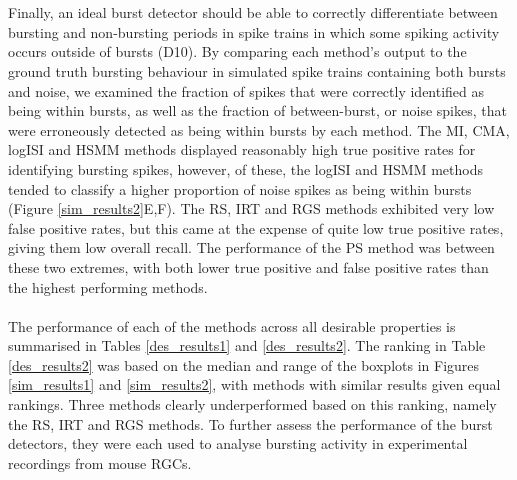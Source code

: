 \documentclass[12pt, titlepage]{article}
\begin{document}
	\\ \\ Finally, an ideal burst detector should be able to correctly differentiate between bursting and non-bursting periods in spike trains in which some spiking activity occurs outside of bursts (D10). By comparing each method's output to the ground truth bursting behaviour in simulated spike trains containing both bursts and noise, we examined the fraction of spikes that were correctly identified as being within bursts, as well as the fraction of between-burst, or noise spikes, that were erroneously detected as being within bursts by each method.
	The MI, CMA, logISI and HSMM methods displayed reasonably high true positive rates for identifying bursting spikes, however, of these, the logISI and HSMM methods tended to classify a higher proportion of noise spikes as being within bursts (Figure \ref{sim_results2}E,F). The RS, IRT and RGS methods exhibited very low false positive rates, but this came at the expense of quite low true positive rates, giving them low overall recall. The performance of the PS method was between these two extremes, with both lower true positive and false positive rates than the highest performing methods.
	\\ \\ The performance of each of the methods across all desirable properties is summarised in Tables \ref{des_results1} and \ref{des_results2}. The ranking in Table \ref{des_results2} was based on the median and range of the boxplots in Figures \ref{sim_results1} and \ref{sim_results2}, with methods with similar results given equal rankings. Three methods clearly underperformed based on this ranking, namely the RS, IRT and RGS methods. To further assess the performance of the burst detectors, they were each used to analyse bursting activity in experimental recordings from mouse RGCs.
\end{document}
